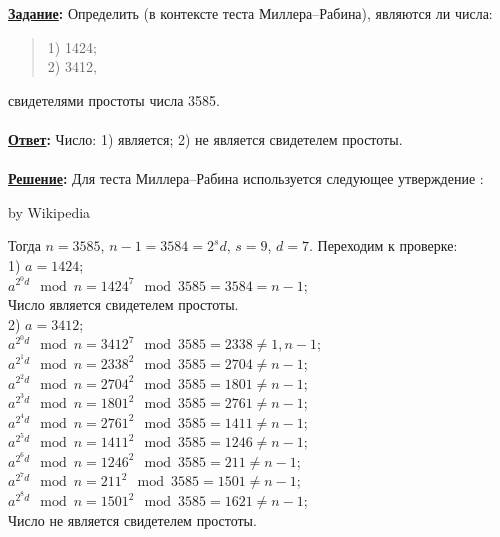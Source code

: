 \documentclass{article}
\begin{document}
\textbf{\uline{Задание}:} Определить (в контексте теста Миллера--Рабина), являются ли числа:
\begin{flushleft}
\begin{verse}
1) 1424;\\
2) 3412,\end{verse}
\end{flushleft}
свидетелями простоты числа 3585.\\
\\
\textbf{\uline{Ответ}:} Число: 1) является; 2) не является свидетелем простоты.\\
\\
\textbf{ \uline{Решение}: } Для теста Миллера--Рабина используется следующее утверждение : \\
\noindent{}
\begin{flushright}\footnotesize by Wikipedia \end{flushright}
Тогда $n=3585$, $n-1=3584=2^{s}d$, $s=9$, $d=7$. Переходим к проверке:\\
1) $a=1424$;\\
$a^{2^{0}d}\mod n=1424^{7}\mod 3585=3584=n-1$;\\
Число является свидетелем простоты.\\
2) $a=3412$;\\
$a^{2^{0}d}\mod n=3412^{7}\mod 3585=2338\not=1, n-1$;\\
$a^{2^{1}d}\mod n=2338^{2}\mod 3585=2704\not=n-1$;\\
$a^{2^{2}d}\mod n=2704^{2}\mod 3585=1801\not=n-1$;\\
$a^{2^{3}d}\mod n=1801^{2}\mod 3585=2761\not=n-1$;\\
$a^{2^{4}d}\mod n=2761^{2}\mod 3585=1411\not=n-1$;\\
$a^{2^{5}d}\mod n=1411^{2}\mod 3585=1246\not=n-1$;\\
$a^{2^{6}d}\mod n=1246^{2}\mod 3585=211\not=n-1$;\\
$a^{2^{7}d}\mod n=211^{2}\mod 3585=1501\not=n-1$;\\
$a^{2^{8}d}\mod n=1501^{2}\mod 3585=1621\not=n-1$;\\
Число не является свидетелем простоты.\\
\end{document}
